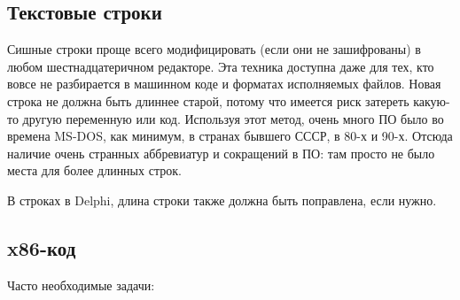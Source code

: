
\subsection{Текстовые строки}

Сишные строки проще всего модифицировать (если они не зашифрованы) в любом шестнадцатеричном редакторе.
Эта техника доступна даже для тех, кто вовсе не разбирается в машинном коде и форматах исполняемых
файлов.
Новая строка не должна быть длиннее старой, потому что имеется риск затереть какую-то другую переменную
или код.
Используя этот метод, очень много ПО было  во времена MS-DOS, как минимум,
в странах бывшего СССР, в 80-х и 90-х.
Отсюда наличие очень странных аббревиатур и сокращений в  ПО: 
там просто не было места для более
длинных строк.

В строках в Delphi, длина строки также должна быть поправлена, если нужно.

\subsection{x86-код}
\label{x86_patching}

Часто необходимые задачи:

